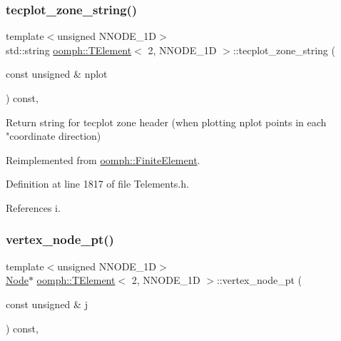 \subsubsection{\texorpdfstring{tecplot\+\_\+zone\+\_\+string()}{tecplot\_zone\_string()}}
{\footnotesize\ttfamily template$<$unsigned N\+N\+O\+D\+E\+\_\+1D$>$ \\
std\+::string \hyperlink{classoomph_1_1TElement}{oomph\+::\+T\+Element}$<$ 2, N\+N\+O\+D\+E\+\_\+1D $>$\+::tecplot\+\_\+zone\+\_\+string (\begin{DoxyParamCaption}\item[{const unsigned \&}]{nplot }\end{DoxyParamCaption}) const\hspace{0.3cm}{\ttfamily [inline]}, {\ttfamily [virtual]}}



Return string for tecplot zone header (when plotting nplot points in each "coordinate direction) 



Reimplemented from \hyperlink{classoomph_1_1FiniteElement_a3193df31f9ce38e0609d17a8ffb386c6}{oomph\+::\+Finite\+Element}.



Definition at line 1817 of file Telements.\+h.



References i.

\mbox{\label{classoomph_1_1TElement_3_012_00_01NNODE__1D_01_4_af6a40f8e3b8051f0b685e64957d47296}} 
\subsubsection{\texorpdfstring{vertex\+\_\+node\+\_\+pt()}{vertex\_node\_pt()}}
{\footnotesize\ttfamily template$<$unsigned N\+N\+O\+D\+E\+\_\+1D$>$ \\
\hyperlink{classoomph_1_1Node}{Node}$\ast$ \hyperlink{classoomph_1_1TElement}{oomph\+::\+T\+Element}$<$ 2, N\+N\+O\+D\+E\+\_\+1D $>$\+::vertex\+\_\+node\+\_\+pt (\begin{DoxyParamCaption}\item[{const unsigned \&}]{j }\end{DoxyParamCaption}) const\hspace{0.3cm}{\ttfamily [inline]}, {\ttfamily [virtual]}}



